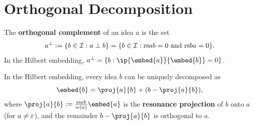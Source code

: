 \section{Orthogonal Decomposition}

\begin{definition}
\label{def:orth-complement}
The \textbf{orthogonal complement} of an idea $a$ is the set
\[
  a^{\perp} := \{b \in \mathcal{I} : a \perp b\}
  = \{b \in \mathcal{I} : \mathrm{rs}{a}{b} = 0 \text{ and } \mathrm{rs}{b}{a} = 0\}.
\]
In the Hilbert embedding, $a^{\perp} = \{b : \ip{\embed{a}}{\embed{b}} = 0\}$.
\end{definition}

\begin{theorem}
\label{thm:orth-decomposition}
In the Hilbert embedding, every idea $b$ can be uniquely decomposed as
\[
  \embed{b} = \proj{a}{b} + (b - \proj{a}{b}),
\]
where $\proj{a}{b} := \frac{\rs{a}{b}}{w(a)} \embed{a}$ is the
\textbf{resonance projection} of $b$ onto $a$ (for $a \neq \varepsilon$), and
the remainder $b - \proj{a}{b}$ is orthogonal to $a$.
\end{theorem}

